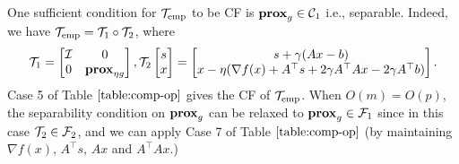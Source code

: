 {{One sufficient condition for ${\mathcal{T}}_\textnormal{emp}$  to be CF is $\mathbf{prox}_g\in{\mathcal{C}}_1$ i.e., separable. Indeed, we have ${\mathcal{T}}_\textnormal{emp}={\mathcal{T}}_1\circ{\mathcal{T}}_2$, where $$\cT_1=\begin{bmatrix}
\cI & 0\\0&\prox_{\eta g}
\end{bmatrix}, \cT_2\begin{bmatrix}
s\\x
\end{bmatrix}=\begin{bmatrix}
s+\gamma (Ax-b)\\
x-\eta(\nabla f(x)+A^\top s+2\gamma A^\top Ax-2\gamma A^\top b)
\end{bmatrix}.$$
  Case 5 of Table $\ref{table:comp-op}$ gives the CF of ${\mathcal{T}}_\textnormal{emp}$. When $O(m)=O(p)$, the separability condition on $\mathbf{prox}_g$ can be relaxed to $\mathbf{prox}_g\in{\mathcal{F}}_1$ since in this case ${\mathcal{T}}_2\in{\mathcal{F}}_2$, and we can apply  Case 7 of Table $\ref{table:comp-op}$ (by maintaining $\nabla f(x)$, $A^\top s$, $Ax$ and $A^\top Ax$.)
}}
